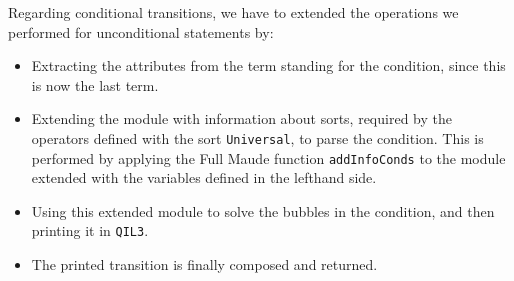 {\begin{comment}
                    M, DB, ODS, PL) =
                           < 'ctrans QILL QIL' '=> QIL'' 'if QIL3 QILA '., ODS >
   if TW := if solveBubbles('bubble[extractLabel(T)], M, false, ODS, DB) :: Term
            then extractLabel(T)
            else T
            fi /\
      TW' := removeEqAtS(T'') /\
      QIL := downQidList(TW) /\
      ODS' := ODS opDeclSetFromQidList(QIL) /\
      T1 := solveBubbles('bubble[TW], M, false, ODS, DB) /\
      T2 := solveSecondTerm(M, 'bubble[TW], 'bubble[T'], ODS', DB) /\
      QIL' := prettyprintParams*(addSpace(metaPrettyPrint(M, T1, printOpts)), PL) /\
      QIL'' := prettyprintParams*(addSpace(metaPrettyPrint(M, T2, printOpts)), PL) /\
      M' := addInfoConds(addOps(ODS', M)) /\
      QIL3 := prettyprintParams*(printCond(M,
                         solveBubblesCond('bubble[TW'], M, M', false, ODS', DB)), PL) /\
      QILL := printLabel(T) /\
      QILA := printAtS(getEqAtS(T'')) .

  ceq printCafeBody('bctrans_=>_if_.['CafeBubble[T], 'CafeBubble[T'], 'CafeBubble[T'']],
                    M, DB, ODS, PL) =
                           < 'ctrans QILL QIL' '=> QIL'' 'if QIL3 QILA '., ODS >
   if TW := if solveBubbles('bubble[extractLabel(T)], M, false, ODS, DB) :: Term
            then extractLabel(T)
            else T
            fi /\
      TW' := removeEqAtS(T'') /\
      QIL := downQidList(TW) /\
      ODS' := ODS opDeclSetFromQidList(QIL) /\
      T1 := solveBubbles('bubble[TW], M, false, ODS, DB) /\
      T2 := solveSecondTerm(M, 'bubble[TW], 'bubble[T'], ODS', DB) /\
      QIL' := prettyprintParams*(addSpace(metaPrettyPrint(M, T1, printOpts)), PL) /\
      QIL'' := prettyprintParams*(addSpace(metaPrettyPrint(M, T2, printOpts)), PL) /\
      M' := addInfoConds(addOps(ODS', M)) /\
      QIL3 := prettyprintParams*(printCond(M,
                         solveBubblesCond('bubble[TW'], M, M', false, ODS', DB)), PL) /\
      QILL := printLabel(T) /\
      QILA := printAtS(getEqAtS(T'')) .
\end{comment}
}

Regarding conditional transitions, we have to extended the operations we performed for
unconditional statements by:
\begin{itemize}
\item
Extracting the attributes from the term standing for the condition, since this is now
the last term.

\item
Extending the module with information about sorts, required by the operators defined
with the sort \verb"Universal", to parse the condition. This is performed by applying
the Full Maude function \verb"addInfoConds" to the module extended with the variables
defined in the lefthand side.

\item
Using this extended module to solve the bubbles in the condition, and then printing
it in \verb"QIL3".

\item
The printed transition is finally composed and returned.
\end{itemize}

